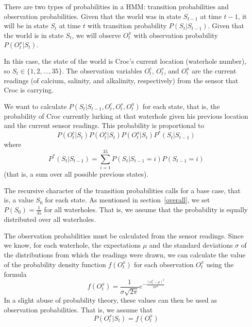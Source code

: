 \documentclass[a4paper]{article}
\begin{document}
There are two types of probabilities in a HMM: transition probabilities and
observation probabilities. %
Given that the world was in state $S_{t-1}$ at time $t-1$, it
will be in state $S_t$ at time $t$ with transition probability
$P(S_t|S_{t-1})$. Given that the world is in state $S_t$, we will observe
$O^x_t$ with observation probability $P(O^x_t|S_t)$.

In this case, the state of the world is Croc's current location (waterhole
number), so $S_t \in \{1, 2, \dots, 35\}$. %
The observation variables $O^c_t$, $O^s_t$, and $O^a_t$ are the current
readings (of calcium, salinity, and alkalinity, respectively) from the sensor
that Croc is carrying.

We want to calculate $P(S_t|S_{t-1}, O^c_t, O^s_t, O^a_t)$ for each state,
that is, the probability of Croc currently lurking at that waterhole
given his previous location and the current sensor readings. This probability
is proportional to
\begin{equation*}
P(O^c_t|S_t)P(O^s_t|S_t)P(O^a_t|S_t)P^*(S_t|S_{t-1})
\end{equation*}
where
\begin{equation*}
P^*(S_t|S_{t-1}) = \sum\limits_{i=1}^{35} P(S_t|S_{t-1}=i)P(S_{t-1}=i)  
\end{equation*}
(that is, a sum over all possible previous states). %

The recursive character of
the transition probabilities calls for a base case, that is, a value $S_0$ for
each state. As mentioned in section~\ref{overall}, we set $P(S_0) =
\frac{1}{35}$ for all waterholes. That is, we assume
that the probability is equally distributed over all waterholes.

The observation probabilities must be calculated from the sensor
readings. Since we know, for each waterhole, the expectations $\mu$ and the
standard deviations $\sigma$ of the distributions from which the readings were
drawn, we can calculate the value of the probability density function
$f(O^x_t)$ for each observation $O^x_t$ using the formula
\begin{equation*}
  f(O^x_t) = \frac{1}{\sigma \sqrt{2 \pi}}e^{-\frac{(O^x_t-\mu)^2}{2\sigma ^2}}
\end{equation*}
In a slight abuse of probability theory, these values can then be used as
observation probabilities. That is, we assume that
\begin{equation*}
  P(O^x_t|S_t) = f(O^x_t)
\end{equation*}
\end{document}

